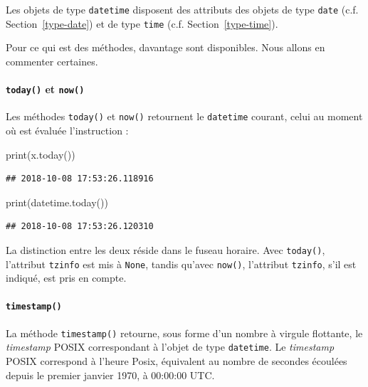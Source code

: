 \documentclass[12pt,]{book}
\newenvironment{Shaded}{\begin{snugshade}}{\end{snugshade}}
\newcommand{\BuiltInTok}[1]{#1}
\newcommand{\NormalTok}[1]{#1}
\let\oldparagraph\paragraph
\renewcommand{\paragraph}[1]{\oldparagraph{#1}\mbox{}}
\numberwithin{equation}{section}
\numberwithin{countremarque}{section}
\begin{document}
Les objets de type \texttt{datetime} disposent des attributs des objets
de type \texttt{date} (c.f. Section~\ref{type-date}) et de type
\texttt{time} (c.f. Section~\ref{type-time}).

Pour ce qui est des méthodes, davantage sont disponibles. Nous allons en
commenter certaines.

\paragraph{\texorpdfstring{\texttt{today()} et
\texttt{now()}}{today() et now()}}\label{today-et-now}

Les méthodes \texttt{today()} et \texttt{now()} retournent le
\texttt{datetime} courant, celui au moment où est évaluée l'instruction
:

\begin{Shaded}
\begin{Highlighting}[]
\BuiltInTok{print}\NormalTok{(x.today())}
\end{Highlighting}
\end{Shaded}

\begin{lstlisting}
## 2018-10-08 17:53:26.118916
\end{lstlisting}

\begin{Shaded}
\begin{Highlighting}[]
\BuiltInTok{print}\NormalTok{(datetime.today())}
\end{Highlighting}
\end{Shaded}

\begin{lstlisting}
## 2018-10-08 17:53:26.120310
\end{lstlisting}

La distinction entre les deux réside dans le fuseau horaire. Avec
\texttt{today()}, l'attribut \texttt{tzinfo} est mis à \texttt{None},
tandis qu'avec \texttt{now()}, l'attribut \texttt{tzinfo}, s'il est
indiqué, est pris en compte.

\paragraph{\texorpdfstring{\texttt{timestamp()}}{timestamp()}}\label{timestamp}

La méthode \texttt{timestamp()} retourne, sous forme d'un nombre à
virgule flottante, le \emph{timestamp} POSIX correspondant à l'objet de
type \texttt{datetime}. Le \emph{timestamp} POSIX correspond à l'heure
Posix, équivalent au nombre de secondes écoulées depuis le premier
janvier 1970, à 00:00:00 UTC.
\end{document}
